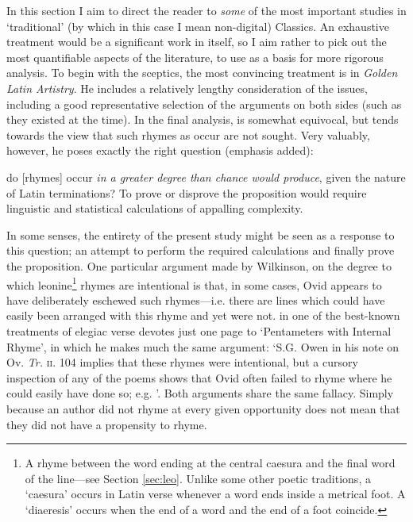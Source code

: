 \documentclass[twocolumn, switch]{article} %
\begin{document}
In this section I aim to direct the reader to \emph{some} of the most
important studies in `traditional' (by which in this case I mean non-digital)
Classics. An exhaustive treatment would be a significant work in itself, so I
aim rather to pick out the most quantifiable aspects of the literature, to use
as a basis for more rigorous analysis. To begin with the sceptics, the most
convincing treatment is  in \emph{Golden Latin
Artistry}. He includes a relatively lengthy consideration of the issues,
including a good representative selection of the arguments on both sides (such
as they existed at the time). In the final analysis,  is somewhat equivocal, but tends towards the view
that such rhymes as occur are not sought. Very valuably, however, he poses
exactly the right question (emphasis added):

\begin{adjustwidth}{0.1\linewidth}{0.1\linewidth}
  \footnotesize
  do [rhymes] occur \emph{in a greater
    degree than chance would produce}, given the nature of Latin terminations? To
  prove or disprove the proposition would require linguistic and statistical
  calculations of appalling complexity.
\end{adjustwidth}
In some senses, the entirety of the present study might be seen as a response
to this question; an attempt to perform the required calculations and finally
prove the proposition. One particular argument made by Wilkinson, on the
degree to which leonine\footnote{
  A rhyme between the word ending at the central caesura and the final word of
  the line---see Section \ref{sec:leo}. Unlike some other poetic traditions, a
  `caesura' occurs in Latin verse whenever a word ends inside a metrical foot.
  A `diaeresis' occurs when the end of a word and the end of a foot coincide.
}
rhymes are intentional is that, in some cases, Ovid appears to have
deliberately eschewed such rhymes---i.e. there are lines which could have
easily been arranged with this rhyme and yet were not.
 in one of the best-known treatments of
elegiac verse devotes just one page to `Pentameters with Internal Rhyme', in
which he makes much the same argument: `S.G. Owen in his note on Ov.
\emph{Tr.} \textsc{ii}. 104 implies that these rhymes were intentional, but a
cursory inspection of any of the poems shows that Ovid often failed to rhyme
where he could easily have done so; e.g. \textellipsis'. Both arguments share
the same fallacy. Simply because an author did not rhyme at every given
opportunity does not mean that they did not have a propensity to rhyme.
\end{document}

